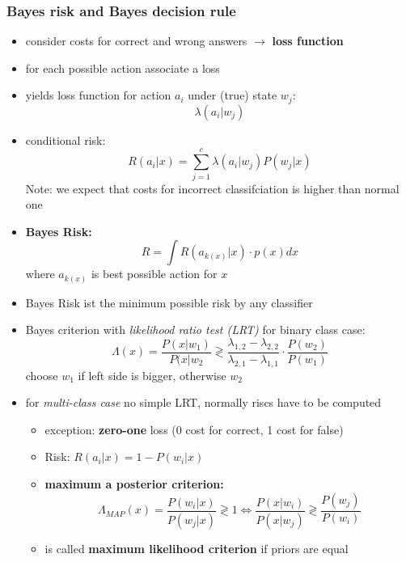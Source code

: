 \documentclass[11pt]{article}
\begin{document}
\subsubsection{Bayes risk and Bayes decision rule}
\label{sec-9-2-3}
\begin{itemize}
\item consider costs for correct and wrong answers $\rightarrow$ \textbf{loss function}
\item for each possible action associate a loss
\item yields loss function for action $a_i$ under (true) state $w_j$:
      \[ \lambda(a_i|w_j) \]
\item conditional risk:
\[ R(a_i|x) = \sum_{j=1}^c \lambda(a_i|w_j)P(w_j|x) \]
Note: we expect that costs for incorrect classifciation is higher than normal one
\item \textbf{Bayes Risk:}
\[ R= \int R(a_{k(x)}|x) \cdot p(x) dx \]
where $a_{k(x)}$ is best possible action for $x$
\item Bayes Risk ist the minimum possible risk by any classifier
\item Bayes criterion with \emph{likelihood ratio test (LRT)} for binary class case:
\[ \Lambda(x) = \frac{P(x|w_1)}{P(x|w_2} \gtrless 
         \frac{\lambda_{1,2} - \lambda_{2,2}}{\lambda_{2,1}-\lambda_{1,1}} \cdot
         \frac{P(w_2)}{P(w_1)} \]
choose $w_1$ if left side is bigger, otherwise $w_2$
\item for \emph{multi-class case} no simple LRT, normally riscs have to be computed
\begin{itemize}
\item exception: \textbf{zero-one} loss (0 cost for correct, 1 cost for false)
\item Risk: $R(a_i|x) = 1-P(w_i|x)$
\item \textbf{maximum a posterior criterion:}
        \[ \Lambda_{MAP}(x) = \frac{P(w_i|x)}{P(w_j|x)} \gtrless 1 \Leftrightarrow 
	   \frac{P(x|w_i)}{P(x|w_j)} \gtrless \frac{P(w_j)}{P(w_i)} \]
\item is called \textbf{maximum likelihood criterion} if priors are equal
\end{itemize}
\end{itemize}
\end{document}
